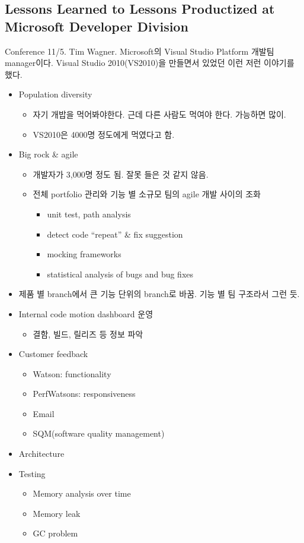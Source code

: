 \documentclass[11pt]{article}
\begin{document}
\subsection{Lessons Learned to Lessons Productized at
  Microsoft Developer Division}

Conference 11/5. Tim Wagner. Microsoft의 Visual Studio Platform 개발팀
manager이다. Visual Studio 2010(VS2010)을 만들면서 있었던 이런 저런 이야기를
했다. 
 
\begin{itemize}
\item Population diversity
    \begin{itemize}
    \item 자기 개밥을 먹어봐야한다. 근데 다른 사람도 먹여야 한다. 가능하면 많이.
    \item VS2010은 4000명 정도에게 먹였다고 함.
    \end{itemize}
\item Big rock \& agile
    \begin{itemize}
    \item 개발자가 3,000명 정도 됨. 잘못 들은 것 같지 않음.
    \item 전체 portfolio 관리와 기능 별 소규모 팀의 agile 개발 사이의 조화
        \begin{itemize}
        \item unit test, path analysis
        \item detect code ``repeat'' \& fix suggestion
        \item mocking frameworks
        \item statistical analysis of bugs and bug fixes
        \end{itemize}
    \end{itemize}
\item 제품 별 branch에서 큰 기능 단위의 branch로 바꿈.  기능 별 팀 구조라서 그런 듯.
\item Internal code motion dashboard 운영
    \begin{itemize}
    \item 결함, 빌드, 릴리즈 등 정보 파악
    \end{itemize}
\item Customer feedback
    \begin{itemize}
    \item Watson: functionality
    \item PerfWatsons: responsiveness
    \item Email
    \item SQM(software quality management)
    \end{itemize}
\item Architecture
\item Testing
    \begin{itemize}
    \item Memory analysis over time
    \item Memory leak
    \item GC problem
    \end{itemize}
\end{itemize}
\end{document}
